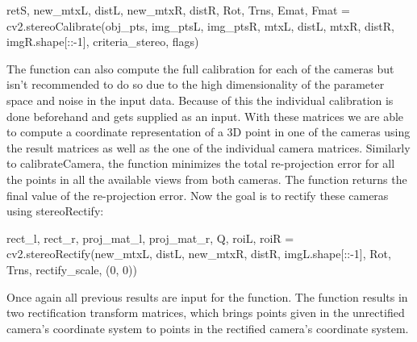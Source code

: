 \documentclass[journal,onecolumn]{IEEEtran}
\begin{document}
\begin{python}
retS, new_mtxL, distL, new_mtxR, distR, Rot, Trns, Emat, Fmat = cv2.stereoCalibrate(obj_pts,
									img_ptsL,
									img_ptsR,
									mtxL,
									distL,
									mtxR,
									distR,
									imgR.shape[::-1],
									criteria_stereo,
									flags)
\end{python}
The function can also compute the full calibration for each of the cameras but isn't recommended to do so due to the high dimensionality of the parameter space and noise in the input data\cite{stereoCalibrate}. Because of this the individual calibration is done beforehand and gets supplied as an input.
With these matrices we are able to compute a coordinate representation of a 3D point in one of the cameras using the result matrices as well as the one of the individual camera matrices.
Similarly to calibrateCamera, the function minimizes the total re-projection error for all the points in all the available views from both cameras. The function returns the final value of the re-projection error.
Now the goal is to rectify these cameras using stereoRectify:
\begin{python}
rect_l, rect_r, proj_mat_l, proj_mat_r, Q, roiL, roiR = cv2.stereoRectify(new_mtxL,
										distL,
										new_mtxR,
										distR,
										imgL.shape[::-1],
										Rot,
										Trns,
										rectify_scale, (0, 0))
\end{python}
Once again all previous results are input for the function. The function results in two rectification transform matrices, which brings points given in the unrectified camera's coordinate system to points in the rectified camera's coordinate system.
\end{document}

